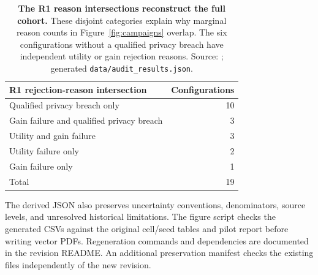 \begin{table}[h]
\centering\small
\begin{tabular}{@{}lr@{}}
\toprule
R1 rejection-reason intersection & Configurations \\
\midrule
Qualified privacy breach only & 10 \\
Gain failure and qualified privacy breach & 3 \\
Utility and gain failure & 3 \\
Utility failure only & 2 \\
Gain failure only & 1 \\
\midrule
Total & 19 \\
\bottomrule
\end{tabular}
\caption{\textbf{The R1 reason intersections reconstruct the full cohort.}
These disjoint categories explain why marginal reason counts in
Figure~\ref{fig:campaigns} overlap. The six configurations without a
qualified privacy breach have independent utility or gain rejection
reasons. Source: ; generated \texttt{data/audit\_results.json}.}
\label{tab:intersections}
\end{table}

The derived JSON also preserves uncertainty conventions, denominators,
source levels, and unresolved historical limitations. The figure script
checks the generated CSVs against the original cell/seed tables and pilot
report before writing vector PDFs. Regeneration commands and dependencies
are documented in the revision README. An additional preservation manifest
checks the existing  files independently of the new revision.
